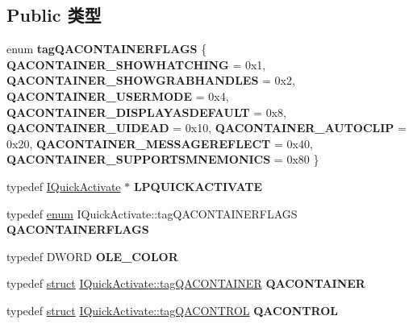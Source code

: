 \subsection*{Public 类型}
\begin{DoxyCompactItemize}
\item 
\mbox{\label{interface_i_quick_activate_a9e3cac468bb0c1f1e44b8e5af6bcc4ff}} 
enum {\bfseries tag\+Q\+A\+C\+O\+N\+T\+A\+I\+N\+E\+R\+F\+L\+A\+GS} \{ \newline
{\bfseries Q\+A\+C\+O\+N\+T\+A\+I\+N\+E\+R\+\_\+\+S\+H\+O\+W\+H\+A\+T\+C\+H\+I\+NG} = 0x1, 
{\bfseries Q\+A\+C\+O\+N\+T\+A\+I\+N\+E\+R\+\_\+\+S\+H\+O\+W\+G\+R\+A\+B\+H\+A\+N\+D\+L\+ES} = 0x2, 
{\bfseries Q\+A\+C\+O\+N\+T\+A\+I\+N\+E\+R\+\_\+\+U\+S\+E\+R\+M\+O\+DE} = 0x4, 
{\bfseries Q\+A\+C\+O\+N\+T\+A\+I\+N\+E\+R\+\_\+\+D\+I\+S\+P\+L\+A\+Y\+A\+S\+D\+E\+F\+A\+U\+LT} = 0x8, 
\newline
{\bfseries Q\+A\+C\+O\+N\+T\+A\+I\+N\+E\+R\+\_\+\+U\+I\+D\+E\+AD} = 0x10, 
{\bfseries Q\+A\+C\+O\+N\+T\+A\+I\+N\+E\+R\+\_\+\+A\+U\+T\+O\+C\+L\+IP} = 0x20, 
{\bfseries Q\+A\+C\+O\+N\+T\+A\+I\+N\+E\+R\+\_\+\+M\+E\+S\+S\+A\+G\+E\+R\+E\+F\+L\+E\+CT} = 0x40, 
{\bfseries Q\+A\+C\+O\+N\+T\+A\+I\+N\+E\+R\+\_\+\+S\+U\+P\+P\+O\+R\+T\+S\+M\+N\+E\+M\+O\+N\+I\+CS} = 0x80
 \}
\item 
\mbox{\label{interface_i_quick_activate_a1bec21f89cea37683744dd9c0df19be4}} 
typedef \hyperlink{interface_i_quick_activate}{I\+Quick\+Activate} $\ast$ {\bfseries L\+P\+Q\+U\+I\+C\+K\+A\+C\+T\+I\+V\+A\+TE}
\item 
\mbox{\label{interface_i_quick_activate_a3b48bb001eda4f6362c0d2d3fb58e7a2}} 
typedef \hyperlink{interfaceenum}{enum} I\+Quick\+Activate\+::tag\+Q\+A\+C\+O\+N\+T\+A\+I\+N\+E\+R\+F\+L\+A\+GS {\bfseries Q\+A\+C\+O\+N\+T\+A\+I\+N\+E\+R\+F\+L\+A\+GS}
\item 
\mbox{\label{interface_i_quick_activate_aaf7dd8f7aa659521578e3a0dd4af3d14}} 
typedef D\+W\+O\+RD {\bfseries O\+L\+E\+\_\+\+C\+O\+L\+OR}
\item 
\mbox{\label{interface_i_quick_activate_a0c4a7015422ad7d20c5c78171269c316}} 
typedef \hyperlink{interfacestruct}{struct} \hyperlink{struct_i_quick_activate_1_1tag_q_a_c_o_n_t_a_i_n_e_r}{I\+Quick\+Activate\+::tag\+Q\+A\+C\+O\+N\+T\+A\+I\+N\+ER} {\bfseries Q\+A\+C\+O\+N\+T\+A\+I\+N\+ER}
\item 
\mbox{\label{interface_i_quick_activate_a156dcb8b3974cc44670f77e50530ffec}} 
typedef \hyperlink{interfacestruct}{struct} \hyperlink{struct_i_quick_activate_1_1tag_q_a_c_o_n_t_r_o_l}{I\+Quick\+Activate\+::tag\+Q\+A\+C\+O\+N\+T\+R\+OL} {\bfseries Q\+A\+C\+O\+N\+T\+R\+OL}
\end{DoxyCompactItemize}

